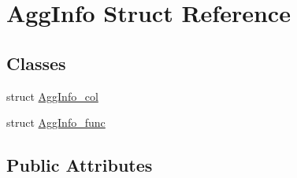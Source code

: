 \hypertarget{struct_agg_info}{}\section{Agg\+Info Struct Reference}
\label{struct_agg_info}
\subsection*{Classes}
\begin{DoxyCompactItemize}
\item 
struct \mbox{\hyperlink{struct_agg_info_1_1_agg_info__col}{Agg\+Info\+\_\+col}}
\item 
struct \mbox{\hyperlink{struct_agg_info_1_1_agg_info__func}{Agg\+Info\+\_\+func}}
\end{DoxyCompactItemize}
\subsection*{Public Attributes}
